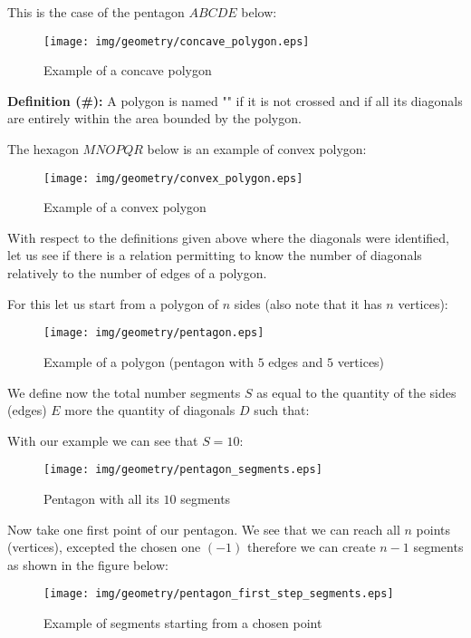 {This is the case of the pentagon $ABCDE$ below:

\begin{figure}[H]
\centering
\texttt{[image: img/geometry/concave\_polygon.eps]}
\caption{Example of a concave polygon}
\end{figure}

	\textbf{Definition (\#\mydef):} A polygon is named "" if it is not crossed and if all its diagonals are entirely within the area bounded by the polygon. 

The hexagon $MNOPQR$ below is an example of convex polygon:
\begin{figure}[H]
\centering
\texttt{[image: img/geometry/convex\_polygon.eps]}
\caption{Example of a convex polygon}
\end{figure}

With respect to the definitions given above where the diagonals were identified, let us see if there is a relation permitting to know the number of diagonals relatively to the number of edges of a polygon.

For this let us start from a  polygon of $n$ sides (also note that it has $n$ vertices):

\begin{figure}[H]
\centering
\texttt{[image: img/geometry/pentagon.eps]}
\caption{Example of a polygon (pentagon with $5$ edges and $5$ vertices)}
\end{figure}

We define now the total number segments $S$ as equal to the quantity of the sides (edges) $E$ more the quantity of diagonals $D$ such that:
	
With our example we can see that $S=10$:

\begin{figure}[H]
\centering
\texttt{[image: img/geometry/pentagon\_segments.eps]}
\caption{Pentagon with all its $10$ segments}
\end{figure}

	Now take one first point of our pentagon. We see that we can reach all $n$ points (vertices), excepted the chosen one $(-1)$ therefore we can create $n-1$ segments as shown in the figure below:

	\begin{figure}[H]
	\centering
		\texttt{[image: img/geometry/pentagon\_first\_step\_segments.eps]}
	\caption{Example of segments starting from a chosen point}
	\end{figure}

}
